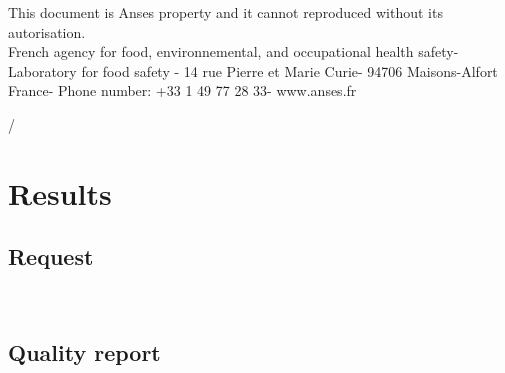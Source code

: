 \documentclass[a4paper]{article}
\begin{document}
\begin{titlepage}

This document is Anses property and it cannot reproduced without its autorisation.\\French agency for food, environnemental, and occupational health safety-Laboratory for food safety - 14 rue Pierre et Marie Curie- 94706 Maisons-Alfort France- Phone number: +33 1 49 77 28 33- www.anses.fr
\begin{flushright}
\thepage/\pageref{LastPage}
\end{flushright}

\vfill %




\end{titlepage}

\setcounter{page}{2}


\section{Results} 
\subsection{Request \\}

{\renewcommand{\arraystretch}{1.5} %
{\setlength{\tabcolsep}{1cm} %
\centering
{}\\[1cm]
}}




\subsection{Quality report \\}
\end{document}
